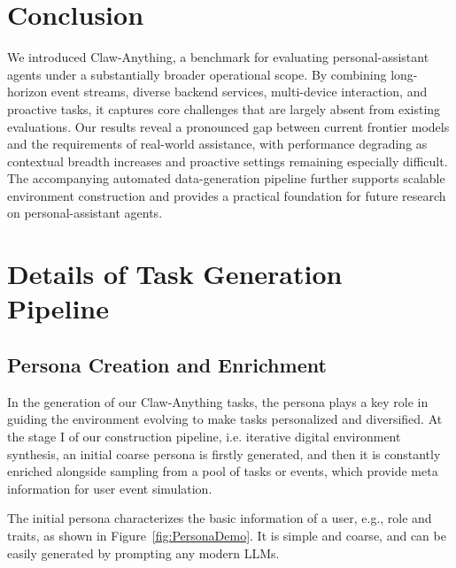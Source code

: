 \documentclass{article}
\begin{document}
\section{Conclusion}
\label{sec:conclusion}
We introduced Claw-Anything, a benchmark for evaluating personal-assistant agents under a substantially broader operational scope. By combining long-horizon event streams, diverse backend services, multi-device interaction, and proactive tasks, it captures core challenges that are largely absent from existing evaluations. Our results reveal a pronounced gap between current frontier models and the requirements of real-world assistance, with performance degrading as contextual breadth increases and proactive settings remaining especially difficult. The accompanying automated data-generation pipeline further supports scalable environment construction and provides a practical foundation for future research on personal-assistant agents.

\small



\newpage
\appendix

\section{Details of Task Generation Pipeline}

\subsection{Persona Creation and Enrichment}

In the generation of our Claw-Anything tasks, the persona plays a key role in guiding the environment evolving to make tasks personalized and diversified. At the stage I of our construction pipeline, i.e. iterative digital environment synthesis, an initial coarse persona is firstly generated, and then it is constantly enriched alongside sampling from a pool of tasks or events, which provide meta information for user event simulation.

The initial persona characterizes the basic information of a user, e.g., role and traits, as shown in Figure~\ref{fig:PersonaDemo}. It is simple and coarse, and can be easily generated by prompting any modern LLMs.
\end{document}
